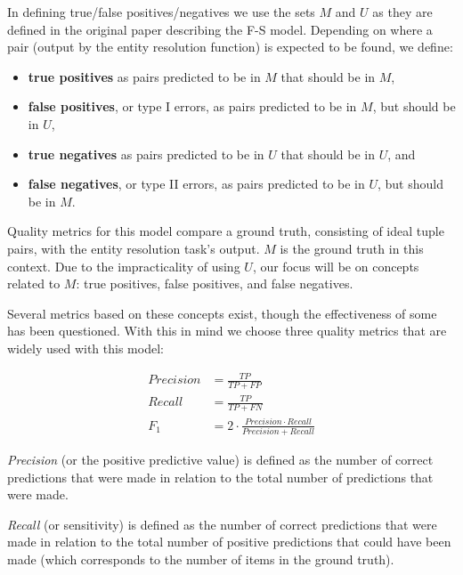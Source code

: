 \documentclass[journal]{IEEEtran}
\begin{document}
    In defining true/false positives/negatives we use the sets $M$ and $U$ as
    they are defined in the original paper describing the F-S model.
    Depending on where a pair (output by the entity resolution function) is
    expected to be found, we define:

    \begin{itemize}
        \item \textbf{true positives} as pairs predicted to be in $M$ that
        should be in $M$,
        \item \textbf{false positives}, or type I errors, as pairs predicted to
        be in $M$, but should be in $U$,
        \item \textbf{true negatives} as pairs predicted to be in $U$ that
        should be in $U$, and
        \item \textbf{false negatives}, or type II errors, as pairs predicted to
        be in $U$, but should be in $M$.
    \end{itemize}

    Quality metrics for this model compare a ground truth, consisting of ideal
    tuple pairs, with the entity resolution task's output.
    $M$ is the ground truth in this context.
    Due to the impracticality of using $U$, our focus will be on concepts
    related to $M$: true positives, false positives, and false negatives.
    
    Several metrics based on these concepts exist, though the effectiveness of
    some has been questioned\cite{Goga2015}.
    With this in mind we choose three quality metrics that are widely used with
    this model:

    \begin{align}
    Precision &= \frac{TP}{TP+FP}\nonumber \\
    Recall &= \frac{TP}{TP+FN}\nonumber \\
    F_1 &=2 \cdot \frac{Precision \cdot Recall}{Precision+Recall}\nonumber
    \end{align}

    \textit{Precision} (or the positive predictive value) is defined as the
    number of correct predictions that were made in relation to the total number
    of predictions that were made.

    \textit{Recall} (or sensitivity) is defined as the number of correct
    predictions that were made in relation to the total number of positive
    predictions that could have been made (which corresponds to the number of
    items in the ground truth).
\end{document}
